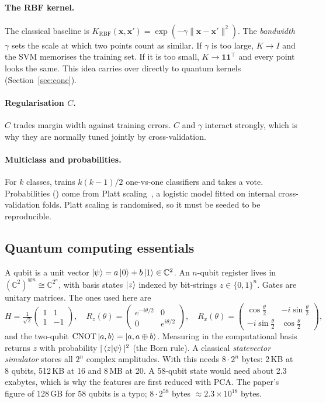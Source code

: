 \paragraph{The RBF kernel.} The classical baseline is $K_{\text{RBF}}(\bm{x},\bm{x}')=\exp(-\gamma\|\bm{x}-\bm{x}'\|^2)$.
The \emph{bandwidth} $\gamma$ sets the scale at which two points count as similar. If $\gamma$ is
too large, $K\to I$ and the SVM memorises the training set. If it is too small, $K\to\bm{1}\bm{1}^\top$
and every point looks the same. This idea carries over directly to quantum kernels
(Section~\ref{sec:conc}).

\paragraph{Regularisation $C$.} $C$ trades margin width against training errors. $C$ and $\gamma$
interact strongly, which is why they are normally tuned jointly by cross-validation.

\paragraph{Multiclass and probabilities.} For $k$ classes,  trains $k(k-1)/2$
one-vs-one classifiers and takes a vote. Probabilities () come from Platt
scaling~\cite{platt1999}, a logistic model fitted on internal cross-validation folds. Platt
scaling is randomised, so it must be seeded to be reproducible.

\subsection{Quantum computing essentials}
A qubit is a unit vector $\left|\psi\right\rangle=a\left|0\right\rangle+b\left|1\right\rangle\in\mathbb{C}^2$. An $n$-qubit register lives in
$(\mathbb{C}^2)^{\otimes n}\cong\mathbb{C}^{2^n}$, with basis states $\left|z\right\rangle$ indexed by bit-strings
$z\in\{0,1\}^n$. Gates are unitary matrices. The ones used here are
\begin{equation}
H=\tfrac{1}{\sqrt2}\begin{pmatrix}1&1\\1&-1\end{pmatrix},\quad
R_z(\theta)=\begin{pmatrix}e^{-i\theta/2}&0\\0&e^{i\theta/2}\end{pmatrix},\quad
R_x(\theta)=\begin{pmatrix}\cos\frac\theta2&-i\sin\frac\theta2\\-i\sin\frac\theta2&\cos\frac\theta2\end{pmatrix},
\end{equation}
and the two-qubit $\mathrm{CNOT}\left|a,b\right\rangle=\left|a,a\oplus b\right\rangle$. Measuring in the computational basis
returns $z$ with probability $|\left\langle z\middle|\psi\right\rangle|^2$ (the Born rule). A classical
\emph{statevector simulator} stores all $2^n$ complex amplitudes. With  this needs
$8\cdot2^n$ bytes: 2\,KB at 8 qubits, 512\,KB at 16 and 8\,MB at 20. A 58-qubit state would need
about 2.3 exabytes, which is why the features are first reduced with PCA. The paper's figure of
128\,GB for 58 qubits is a typo; $8\cdot 2^{58}$ bytes $\approx 2.3\times10^{18}$ bytes.

